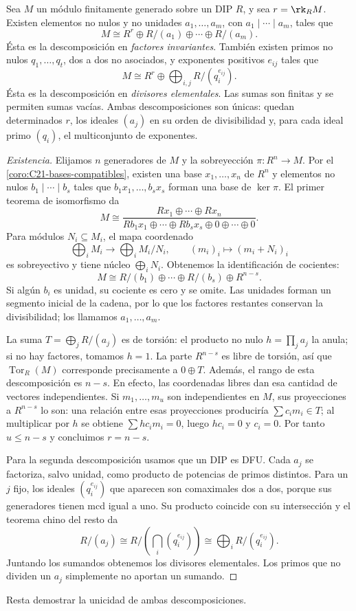 \begin{teo}\label{teo:C21-clasificacion}
Sea $M$ un módulo finitamente generado sobre un DIP $R$, y sea $r=\rk_R M$. Existen elementos no nulos y no unidades $a_1,\ldots,a_m$, con $a_1\mid\cdots\mid a_m$, tales que
\[
M\cong R^r\oplus R/(a_1)\oplus\cdots\oplus R/(a_m).
\]
Ésta es la descomposición en \emph{factores invariantes}. También existen primos no nulos $q_1,\ldots,q_t$, dos a dos no asociados, y exponentes positivos $e_{ij}$ tales que
\[
M\cong R^r\oplus\bigoplus_{i,j}R/(q_i^{e_{ij}}).
\]
Ésta es la descomposición en \emph{divisores elementales}. Las sumas son finitas y se permiten sumas vacías. Ambas descomposiciones son únicas: quedan determinados $r$, los ideales $(a_j)$ en su orden de divisibilidad y, para cada ideal primo $(q_i)$, el multiconjunto de exponentes.
\end{teo}
\begin{proof}[Existencia]
Elijamos $n$ generadores de $M$ y la sobreyección $\pi:R^n\to M$. Por el \cref{coro:C21-bases-compatibles}, existen una base $x_1,\ldots,x_n$ de $R^n$ y elementos no nulos $b_1\mid\cdots\mid b_s$ tales que $b_1x_1,\ldots,b_sx_s$ forman una base de $\ker\pi$. El primer teorema de isomorfismo da
\[
M\cong\frac{Rx_1\oplus\cdots\oplus Rx_n}
 {Rb_1x_1\oplus\cdots\oplus Rb_sx_s\oplus0\oplus\cdots\oplus0}.
\]
Para módulos $N_i\subseteq M_i$, el mapa coordenado
\[
\bigoplus_i M_i\longrightarrow\bigoplus_i M_i/N_i,
\qquad (m_i)_i\longmapsto(m_i+N_i)_i
\]
es sobreyectivo y tiene núcleo $\bigoplus_i N_i$. Obtenemos la identificación de cocientes:
\[
M\cong R/(b_1)\oplus\cdots\oplus R/(b_s)\oplus R^{n-s}.
\]
Si algún $b_i$ es unidad, su cociente es cero y se omite. Las unidades forman un segmento inicial de la cadena, por lo que los factores restantes conservan la divisibilidad; los llamamos $a_1,\ldots,a_m$.

La suma $T=\bigoplus_jR/(a_j)$ es de torsión: el producto no nulo $h=\prod_j a_j$ la anula; si no hay factores, tomamos $h=1$. La parte $R^{n-s}$ es libre de torsión, así que $\operatorname{Tor}_R(M)$ corresponde precisamente a $0\oplus T$. Además, el rango de esta descomposición es $n-s$. En efecto, las coordenadas libres dan esa cantidad de vectores independientes. Si $m_1,\ldots,m_u$ son independientes en $M$, sus proyecciones a $R^{n-s}$ lo son: una relación entre esas proyecciones produciría $\sum c_im_i\in T$; al multiplicar por $h$ se obtiene $\sum hc_im_i=0$, luego $hc_i=0$ y $c_i=0$. Por tanto $u\leq n-s$ y concluimos $r=n-s$.

Para la segunda descomposición usamos que un DIP es DFU. Cada $a_j$ se factoriza, salvo unidad, como producto de potencias de primos distintos. Para un $j$ fijo, los ideales $(q_i^{e_{ij}})$ que aparecen son comaximales dos a dos, porque sus generadores tienen mcd igual a uno. Su producto coincide con su intersección y el teorema chino del resto da
\[
R/(a_j)\cong
R/\!\left(\bigcap_i(q_i^{e_{ij}})\right)
\cong\bigoplus_iR/(q_i^{e_{ij}}).
\]
Juntando los sumandos obtenemos los divisores elementales. Los primos que no dividen un $a_j$ simplemente no aportan un sumando.
\end{proof}
Resta demostrar la unicidad de ambas descomposiciones.

